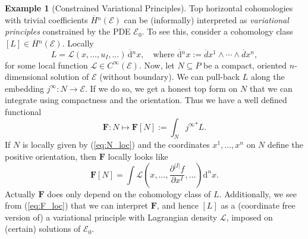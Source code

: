 \documentclass{conm-p-l}
\theoremstyle{definition}
\newtheorem{example}[theorem]{Example}
\theoremstyle{remark}
\numberwithin{equation}{section}
\begin{document}
\begin{example}[Constrained Variational Principles]\label{exmpl:var_prin}
Top horizontal cohomologies with trivial coefficients $\overline H{}^n (\mathscr E)$ can be (informally) interpreted as \emph{variational principles} constrained by the PDE $\mathscr E_0$. To see this, consider a cohomology class $[L] \in \overline H{}^n (\mathscr E)$. Locally
\[
L = \mathscr L (x, \ldots, u_I, \ldots)\, \overline{\mathrm{d}}{}^n x, \quad \text{where $\overline{\mathrm{d}}{}^n x := \overline d x^1 \wedge \cdots \wedge \overline d x^n$},
\]
for some local function $\mathscr L \in C^\infty (\mathscr E)$. Now, let $N \subseteq P$ be a compact, oriented $n$-dimensional solution of $\mathscr E$ (without boundary). We can pull-back $L$ along the embedding $j^\infty : N \to \mathscr E$. If we do so, we get a honest top form on $N$ that we can integrate using compactness and the orientation. Thus we have a well defined functional
\[
\mathbf F : N \mapsto \mathbf F [N] := \int_N j^\infty{}^\ast L.
\]
If $N$ is locally given by (\ref{eq:N_loc}) and the coordinates $x^1, \ldots, x^n$ on $N$ define the positive orientation, then $\mathbf F$ locally looks like
\begin{equation}\label{eq:F_loc}
\mathbf F [N] = \int \mathscr L \left(x, \ldots, \frac{\partial^{|I|} f}{\partial x^I}, \ldots \right) \mathrm{d}^n x.
\end{equation} 
Actually $\mathbf F$ does only depend on the cohomology class of $L$. Additionally, we see from (\ref{eq:F_loc}) that we can interpret $\mathbf F$, and hence $[L]$ as a (coordinate free version of) a variational principle with Lagrangian density $\mathscr L$, imposed on (certain) solutions of $\mathscr E_0$.
\end{example}
\end{document}
